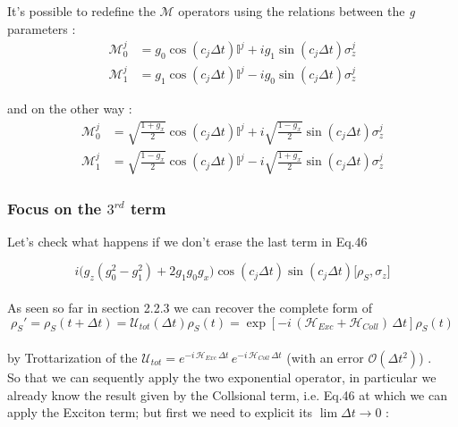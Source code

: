 \documentclass[a4paper,12pt]{article}
\begin{document}
	It's possible to redefine the $ \mathcal{M} $ operators using the relations between the \textit{g} parameters :
	\begin{align}
		\mathcal{M}_{0}^{j}&= g_0 \cos(c_j \Delta t) \mathbb{I}^{j} + i g_1 \sin(c_j \Delta t) \sigma_{z}^{j} \label{eq:M0_simplified} \\
		\mathcal{M}_{1}^{j} &= g_1 \cos(c_j \Delta t) \mathbb{I}^{j} - i g_0 \sin(c_j \Delta t) \sigma_{z}^{j} \label{eq:M1_simplified}
	\end{align}

	and on the other way :
	\begin{align}
		\mathcal{M}_{0}^{j} &= \sqrt{\frac{1+g_x}{2}} \cos(c_j \Delta t) \mathbb{I}^{j} + i \sqrt{\frac{1-g_x}{2}} \sin(c_j \Delta t) \sigma_{z}^{j} \\
		\mathcal{M}_{1}^{j} &= \sqrt{\frac{1-g_x}{2}} \cos(c_j \Delta t) \mathbb{I}^{j} - i \sqrt{\frac{1+g_x}{2}} \sin(c_j \Delta t) \sigma_{z}^{j}
	\end{align}

	\subsubsection{Focus on the $ 3^{rd} $ term}
	Let's check what happens if we don't erase the last term in Eq.46

	\begin{equation}
		i \Big( g_{z}\left(g_{0}^{2} - g_{1}^{2} \right) + 2 g_{1} g_{0} g_{x} \Big) \cos{\left(c_j \Delta t \right)} \sin{\left(c_j \Delta t \right)} \Big[\rho_S , \sigma_{z} \Big]
		\label{eq:3_term}
	\end{equation}
	\\
	As seen so far in section 2.2.3 we can recover the complete form of
	\begin{equation}
		\rho_S' = \rho_S (t + \Delta t) = \mathcal{U}_{tot}(\Delta t) \rho_S (t) = \exp{\left[-i \, \left(\mathcal{H}_{Exc} + \mathcal{H}_{Coll} \right) \, \Delta t \right]} \rho_S (t)
		\label{eq:rho_S_LVN_comp_evo}
	\end{equation}\\
	by Trottarization of the $ \mathcal{U}_{tot} = e^{-i \, \mathcal{H}_{Exc} \, \Delta t } \, e^{-i \, \mathcal{H}_{Coll} \, \Delta t }  $ (with an error $ \mathcal{O}\left(\Delta t^2\right) $) .\\
	So that we can sequently apply the two exponential operator, in particular we already know the result given by the Collsional term, i.e. Eq.46 at which we can apply the Exciton term; but first we need to explicit its $ \lim{\Delta t \rightarrow 0} $ :
\end{document}
